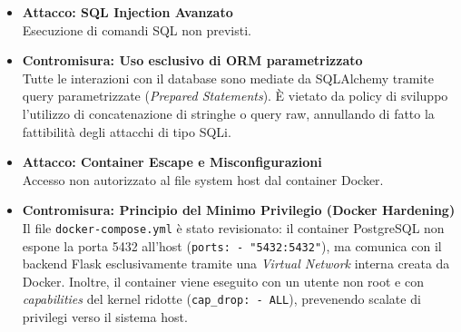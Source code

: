 \begin{itemize}
    \item \textbf{Attacco: SQL Injection Avanzato}\\
    Esecuzione di comandi SQL non previsti.
    \item \textbf{Contromisura: Uso esclusivo di ORM parametrizzato}\\
    Tutte le interazioni con il database sono mediate da SQLAlchemy tramite query parametrizzate (\textit{Prepared Statements}). È vietato da policy di sviluppo l'utilizzo di concatenazione di stringhe o query raw, annullando di fatto la fattibilità degli attacchi di tipo SQLi.
    
    \item \textbf{Attacco: Container Escape e Misconfigurazioni}\\
    Accesso non autorizzato al file system host dal container Docker.
    \item \textbf{Contromisura: Principio del Minimo Privilegio (Docker Hardening)}\\
    Il file \texttt{docker-compose.yml} è stato revisionato: il container PostgreSQL non espone la porta 5432 all'host (\texttt{ports: - "5432:5432"}), ma comunica con il backend Flask esclusivamente tramite una \textit{Virtual Network} interna creata da Docker. Inoltre, il container viene eseguito con un utente non root e con \textit{capabilities} del kernel ridotte (\texttt{cap\_drop: - ALL}), prevenendo scalate di privilegi verso il sistema host.
\end{itemize}



    
